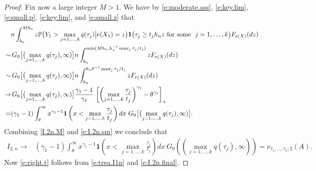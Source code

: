 \documentclass[12pt]{amsart}
\newcommand{\LFe}{F_{e(X)}}
\newcommand{\1}{\mathbbm{1}}
\newcommand{\0}{\mathbf{0}}
\newcommand{\one}{\mathbf{1}}
\theoremstyle{plain}
\theoremstyle{definition}
\newcommand{\bbP}{\mathbb{P}}
\begin{document}
\begin{proof}
Fix now a large integer $M>1$. We have 
 by \eqref{e:moderate.ass}, \eqref{e:key.lim},\eqref{e:small.p}, \eqref{e:key.lim},  and
\eqref{e:small.z} that 
\begin{align} \label{e:I.2n.sm}
  &n \int_{b_n}^{Mb_n}  z\bbP\bigl(   Y_1> \max_{j=1,\ldots, k} q(\tau_j)
          \big| e(X_1)=z\bigr) \one \bigl( \tau_j\geq t_jh_nz \
          \text{for some} \ \ j=1,\ldots, k\bigr) \LFe(dz)   \\
\notag \sim& \, G_0\bigl[\bigl( \max_{j=1,\ldots, k} q(\tau_j),
               \infty)\bigr] n \int_{b_n}^{\min(Mb_n,h_n^{-1}\max_j
             \tau_j/t_j)}z \LFe(dz)  \\
\notag \sim& \, G_0\bigl[\bigl( \max_{j=1,\ldots, k} q(\tau_j),
               \infty)\bigr] n \int_{b_n}^{b_n \theta^{-1}\max_j
             \tau_j/t_j}z \LFe(dz) \\
\notag \to&\, G_0\bigl[\bigl( \max_{j=1,\ldots, k} q(\tau_j),
               \infty)\bigr] \frac{\gamma_1-1}{\gamma_1} \, 
\left[ \left(\max_{j=1,\ldots, k}
            \frac{\tau_j}{t_j}\right)^{\gamma_1}-\theta^{\gamma_1}\right]_+ \\
  \notag =&   (\gamma_1-1)
\int_\theta^{\infty}  x^{\gamma_1-1} \one\left( x<\max_{j=1,\ldots,
            k}\frac{\tau_j}{t_j}\right) dx  \   G_0\bigl[\bigl( \max_{j=1,\ldots, k} q(\tau_j),
               \infty)\bigr]. 
\end{align}
Combining \eqref{I.2n.M} and \eqref{e:I.2n.sm} we conclude that
\begin{align} \label{e:I.2n.final}
I_{2,n} \to&   (\gamma_1-1) \int_\theta^{\infty}  x^{\gamma_1-1} \one\left( x<\max_{j=1,\ldots,
            k}\frac{\tau_j}{t_j}\right) dx 
  \   G_0((
             \max_{j=1,\ldots, k} q(\tau_j),\infty))=
            \nu_{\tau_1,\ldots,\tau_k;2}(A).  
\end{align}
Now \eqref{e:right.t} follows from \eqref{e:trea.I1n} and
\eqref{e:I.2n.final}. 


\end{proof}
\end{document}
